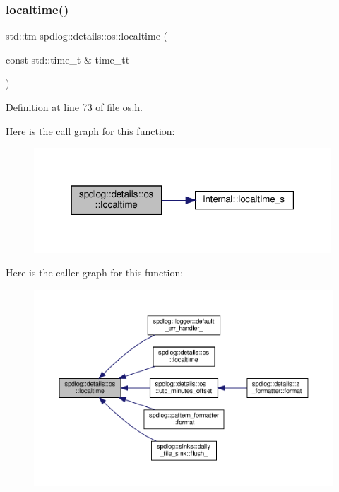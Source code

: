 \subsubsection{\texorpdfstring{localtime()}{localtime()}\hspace{0.1cm}{\footnotesize\ttfamily [1/2]}}
{\footnotesize\ttfamily std\+::tm spdlog\+::details\+::os\+::localtime (\begin{DoxyParamCaption}\item[{const std\+::time\+\_\+t \&}]{time\+\_\+tt }\end{DoxyParamCaption})\hspace{0.3cm}{\ttfamily [inline]}}



Definition at line 73 of file os.\+h.

Here is the call graph for this function\+:
\nopagebreak
\begin{figure}[H]
\begin{center}
\leavevmode
\includegraphics[width=316pt]{namespacespdlog_1_1details_1_1os_aef63b92ee93ec66603c0357d0ac75bed_cgraph}
\end{center}
\end{figure}
Here is the caller graph for this function\+:
\nopagebreak
\begin{figure}[H]
\begin{center}
\leavevmode
\includegraphics[width=350pt]{namespacespdlog_1_1details_1_1os_aef63b92ee93ec66603c0357d0ac75bed_icgraph}
\end{center}
\end{figure}
\mbox{\label{namespacespdlog_1_1details_1_1os_a3c7704d0c74aed204f258ac1fc7d4576}} 
